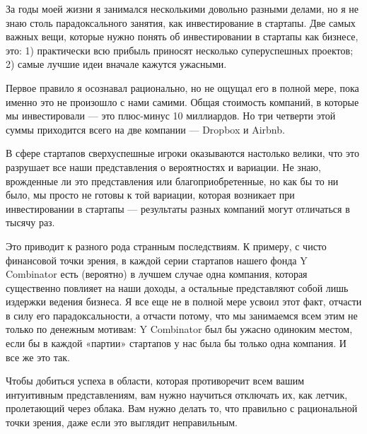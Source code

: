 \documentclass[ebook,12pt,oneside,openany]{memoir}
\begin{document}
\maketitle

За годы моей жизни я занимался несколькими довольно разными делами, но
я не знаю столь парадоксального занятия, как инвестирование в
стартапы. Две самых важных вещи, которые нужно понять об
инвестировании в стартапы как бизнесе, это: 1) практически всю прибыль
приносят несколько суперуспешных проектов; 2) самые лучшие идеи
вначале кажутся ужасными. \newline

Первое правило я осознавал рационально, но не ощущал его в полной
мере, пока именно это не произошло с нами самими. Общая стоимость
компаний, в которые мы инвестировали — это плюс-минус 10 миллиардов.
Но три четверти этой суммы приходится всего на две компании — Dropbox
и Airbnb. \newline

В сфере стартапов сверхуспешные игроки оказываются настолько велики,
что это разрушает все наши представления о вероятностях и вариации. Не
знаю, врожденные ли это представления или благоприобретенные, но как
бы то ни было, мы просто не готовы к той вариации, которая возникает
при инвестировании в стартапы — результаты разных компаний могут
отличаться в тысячу раз. \newline

Это приводит к разного рода странным последствиям. К примеру, с чисто
финансовой точки зрения, в каждой серии стартапов нашего фонда Y
Combinator есть (вероятно) в лучшем случае одна компания, которая
существенно повлияет на наши доходы, а остальные представляют собой
лишь издержки ведения бизнеса. Я все еще не в полной мере усвоил этот
факт, отчасти в силу его парадоксальности, а отчасти потому, что мы
занимаемся всем этим не только по денежным мотивам: Y Combinator был
бы ужасно одиноким местом, если бы в каждой «партии» стартапов у нас
была бы только одна компания. И все же это так. \newline

Чтобы добиться успеха в области, которая противоречит всем вашим
интуитивным представлениям, вам нужно научиться отключать их, как
летчик, пролетающий через облака. Вам нужно делать то, что правильно с
рациональной точки зрения, даже если это выглядит неправильным. \newline
\end{document}
